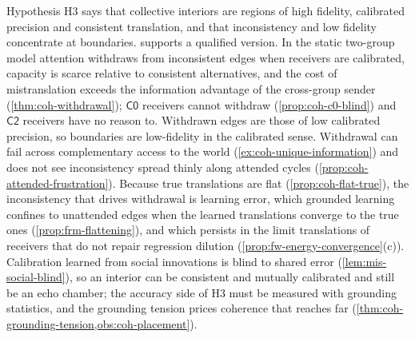 Hypothesis H3 says that collective interiors are regions of high fidelity, calibrated precision and consistent translation, and that inconsistency and low fidelity concentrate at boundaries.  supports a qualified version. In the static two-group model attention withdraws from inconsistent edges when receivers are calibrated, capacity is scarce relative to consistent alternatives, and the cost of mistranslation exceeds the information advantage of the cross-group sender (\cref{thm:coh-withdrawal}); $\mathsf{C0}$ receivers cannot withdraw (\cref{prop:coh-c0-blind}) and $\mathsf{C2}$ receivers have no reason to. Withdrawn edges are those of low calibrated precision, so boundaries are low-fidelity in the calibrated sense. Withdrawal can fail across complementary access to the world (\cref{ex:coh-unique-information}) and does not see inconsistency spread thinly along attended cycles (\cref{prop:coh-attended-frustration}). Because true translations are flat (\cref{prop:coh-flat-true}), the inconsistency that drives withdrawal is learning error, which grounded learning confines to unattended edges when the learned translations converge to the true ones (\cref{prop:frm-flattening}), and which persists in the limit translations of receivers that do not repair regression dilution (\cref{prop:fw-energy-convergence}(c)). Calibration learned from social innovations is blind to shared error (\cref{lem:mis-social-blind}), so an interior can be consistent and mutually calibrated and still be an echo chamber; the accuracy side of H3 must be measured with grounding statistics, and the grounding tension prices coherence that reaches far (\cref{thm:coh-grounding-tension,obs:coh-placement}).

